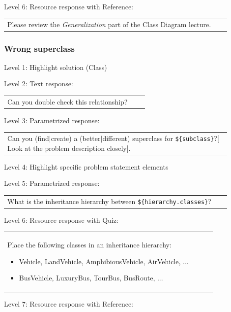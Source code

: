 \noindent Level 6: Resource response with Reference: \medskip

\begin{tabular}{|p{0.9\linewidth}}
Please review the \textit{Generalization} part of the Class Diagram lecture.
\end{tabular} \medskip


\subsubsection{Wrong superclass}

\noindent Level 1: Highlight solution (Class) \medskip

\noindent Level 2: Text response: \medskip

\begin{tabular}{|p{0.9\linewidth}}
Can you double check this relationship?
\end{tabular} \medskip

\noindent Level 3: Parametrized response: \medskip

\begin{tabular}{|p{0.9\linewidth}}
Can you (find$|$create) a (better$|$different) superclass for \verb|${subclass}|?[ Look at the problem description closely].
\end{tabular} \medskip

\noindent Level 4: Highlight specific problem statement elements \medskip

\noindent Level 5: Parametrized response: \medskip

\begin{tabular}{|p{0.9\linewidth}}
What is the inheritance hierarchy between \verb|${hierarchy.classes}|?
\end{tabular} \medskip

\noindent Level 6: Resource response with Quiz: \medskip

\begin{tabular}{|p{0.9\linewidth}}
Place the following classes in an inheritance hierarchy:

\begin{itemize}
    \item Vehicle, LandVehicle, AmphibiousVehicle, AirVehicle, ...
    \item BusVehicle, LuxuryBus, TourBus, BusRoute, ...
\end{itemize}

\end{tabular} \medskip

\noindent Level 7: Resource response with Reference: \medskip

